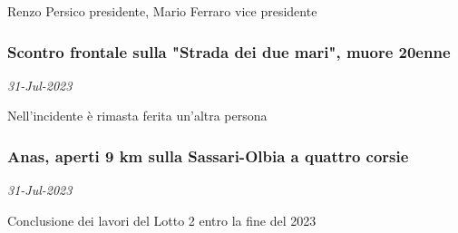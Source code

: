 Renzo Persico presidente, Mario Ferraro vice presidente
\subsubsection{Scontro frontale sulla "Strada dei due mari", muore 20enne \href{https://www.ansa.it/sardegna/notizie/2023/07/31/scontro-frontale-sulla-provinciale-ad-alghero-muore-20enne_9c5821bf-8a79-417c-ab68-20e4e6630ec9.html}{}}
\textit{31-Jul-2023}

Nell'incidente \`{e} rimasta ferita un'altra persona
\subsubsection{Anas, aperti 9 km sulla Sassari-Olbia a quattro corsie \href{https://www.ansa.it/sardegna/notizie/2023/07/31/anas-aperti-9-km-sulla-sassari-olbia-a-quattro-corsie_f0b2a6e7-925e-4174-8a64-4f1fe456fdff.html}{}}
\textit{31-Jul-2023}

Conclusione dei lavori del Lotto 2 entro la fine del 2023
